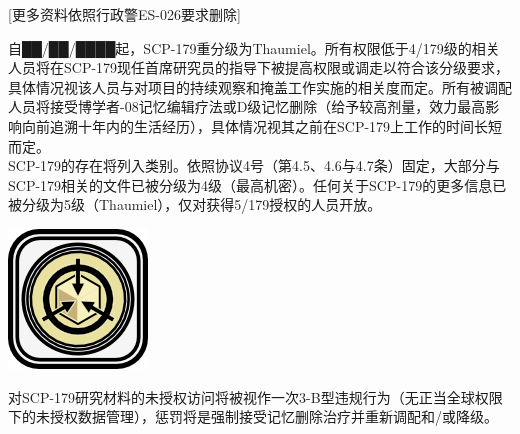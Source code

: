 {[}更多资料依照行政警ES-026要求删除]

\begin{whiteboxbb}[colframe=textred, parbox=false]
    

\begin{minipage}{\textwidth}
\begin{minipage}{0.8\textwidth}
自██\slash ██\slash ████起，SCP-179重分级为Thaumiel。所有权限低于4\slash 179级的相关人员将在SCP-179现任首席研究员的指导下被提高权限或调走以符合该分级要求，具体情况视该人员与对项目的持续观察和掩盖工作实施的相关度而定。所有被调配人员将接受博学者-08记忆编辑疗法或D级记忆删除（给予较高剂量，效力最高影响向前追溯十年内的生活经历），具体情况视其之前在SCP-179上工作的时间长短而定。\\

SCP-179的存在将列入类别。依照协议4号（第4.5、4.6与4.7条）固定，大部分与SCP-179相关的文件已被分级为4级（最高机密）。任何关于SCP-179的更多信息已被分级为5级（Thaumiel），仅对获得5\slash 179授权的人员开放。
\end{minipage} %
\hfill %
\begin{minipage}{0.15\textwidth}
\centering


\includegraphics[max width=0.9\linewidth]{images/SCP-179.png}

\end{minipage}
\end{minipage}

对SCP-179研究材料的未授权访问将被视作一次3-B型违规行为（无正当全球权限下的未授权数据管理），惩罚将是强制接受记忆删除治疗并重新调配和\slash 或降级。
\end{whiteboxbb}

